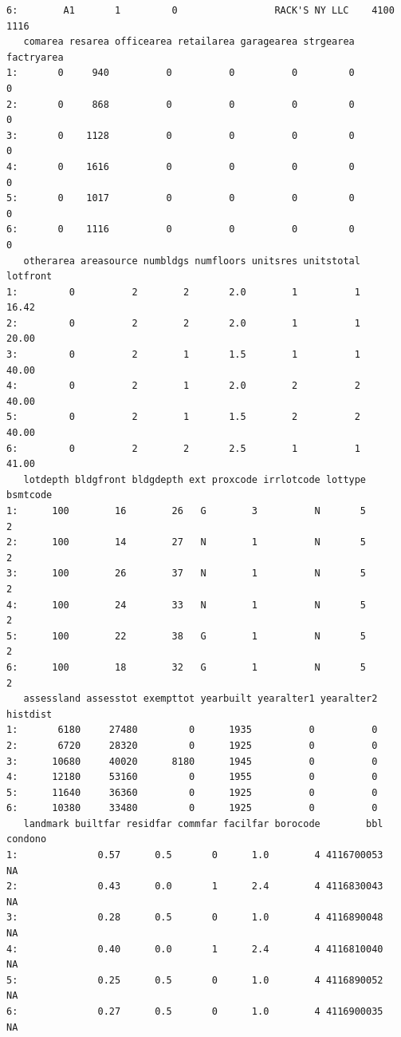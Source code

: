 \documentclass[
  letterpaper,
  DIV=11,
  numbers=noendperiod]{scrartcl}
\begin{document}
\begin{verbatim}
6:        A1       1         0                 RACK'S NY LLC    4100     1116
   comarea resarea officearea retailarea garagearea strgearea factryarea
1:       0     940          0          0          0         0          0
2:       0     868          0          0          0         0          0
3:       0    1128          0          0          0         0          0
4:       0    1616          0          0          0         0          0
5:       0    1017          0          0          0         0          0
6:       0    1116          0          0          0         0          0
   otherarea areasource numbldgs numfloors unitsres unitstotal lotfront
1:         0          2        2       2.0        1          1    16.42
2:         0          2        2       2.0        1          1    20.00
3:         0          2        1       1.5        1          1    40.00
4:         0          2        1       2.0        2          2    40.00
5:         0          2        1       1.5        2          2    40.00
6:         0          2        2       2.5        1          1    41.00
   lotdepth bldgfront bldgdepth ext proxcode irrlotcode lottype bsmtcode
1:      100        16        26   G        3          N       5        2
2:      100        14        27   N        1          N       5        2
3:      100        26        37   N        1          N       5        2
4:      100        24        33   N        1          N       5        2
5:      100        22        38   G        1          N       5        2
6:      100        18        32   G        1          N       5        2
   assessland assesstot exempttot yearbuilt yearalter1 yearalter2 histdist
1:       6180     27480         0      1935          0          0         
2:       6720     28320         0      1925          0          0         
3:      10680     40020      8180      1945          0          0         
4:      12180     53160         0      1955          0          0         
5:      11640     36360         0      1925          0          0         
6:      10380     33480         0      1925          0          0         
   landmark builtfar residfar commfar facilfar borocode        bbl condono
1:              0.57      0.5       0      1.0        4 4116700053      NA
2:              0.43      0.0       1      2.4        4 4116830043      NA
3:              0.28      0.5       0      1.0        4 4116890048      NA
4:              0.40      0.0       1      2.4        4 4116810040      NA
5:              0.25      0.5       0      1.0        4 4116890052      NA
6:              0.27      0.5       0      1.0        4 4116900035      NA

\end{verbatim}
\end{document}
